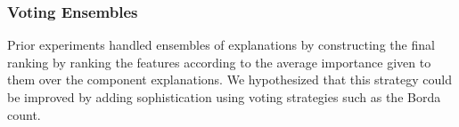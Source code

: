 \documentclass[12pt]{article}  %
\begin{document}
        
    
        
            
   
    
 
    




    
    

    
    
  
  
 
        \subsubsection{Voting Ensembles}
            Prior experiments handled ensembles of explanations by constructing the final ranking by ranking the features according to the average importance given to them over the component explanations. We hypothesized that this strategy could be improved by adding sophistication using voting strategies such as the Borda count. 
            
\end{document}
